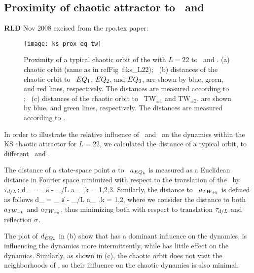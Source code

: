 \subsection{Proximity of chaotic attractor to \eqva\ and \reqva}
\label{sec:proxeq}

{\bf RLD} Nov 2008  excised  from the rpo.tex paper:

\begin{figure}[t]
\begin{center}
\texttt{[image: ks\_prox\_eq\_tw]}
\end{center}
\caption{\color{blue}
Proximity of a typical chaotic orbit of the \KSe with $L =
22$ to \eqva\ and \reqva. (a) chaotic orbit (same as in
refFig~{f:ks\_L22}); ~(b) distances of the chaotic orbit to
\eqva\ $EQ_{1}$, $EQ_{2}$, and $EQ_{3}$, are shown by
blue, green, and red lines, respectively. The distances are
measured according to ; ~(c) distances of
the chaotic orbit to \reqva\ TW$_{\pm 1}$ and TW$_{\pm 2}$,
are shown by blue, and green lines, respectively. The
distances are measured according to .
     } \label{f:ks_prox_eq}
\end{figure}

In order to illustrate the relative influence of \eqva\ and \reqva\ on the dynamics
within the KS chaotic attractor for $L = 22$, we calculated the distance of a
typical orbit, to different \eqva\ and \reqva.

The distance of a state-space point $a$ to \eqv\ $a_{EQ_{k}}$ is measured as a
Euclidean distance in Fourier space minimized with respect to the translation
of the \eqv\ by $\tau_{d/L}$:
\beq
  d_{} = \min_\shift \|a - \Shift_{\shift/L} a_{} \|\,,\quad k = 1,2,3.
\label{eq:proxeq}
\eeq
Similarly, the distance to \reqv\ $a_{TW_{\pm k}}$ is defined as follows
\beq
  d_{} = \min_{\shift} \|a - \Shift_{\shift/L} a_{} \|\,,\quad k = 1,2,
\label{eq:proxtw}
\eeq
where we consider the distance to both $a_{TW_{-k}}$ and $a_{TW_{+k}}$, thus
minimizing both with respect to translation $\tau_{d/L}$ and reflection $\sigma$.

The plot of $d_{EQ_{k}}$ in (b) show that  has a dominant
influence on the dynamics,  is influencing the dynamics more intermittently, while
 has little effect on the dynamics.  Similarly, as shown in (c),
the chaotic orbit does not visit the neighborhoods of \reqva , so their influence on
the chaotic dynamics is also minimal.

